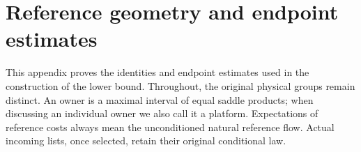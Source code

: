 \section{Reference geometry and endpoint estimates}
\label{app:endpoint-details}

This appendix proves the identities and endpoint estimates used in the
construction of the lower bound. Throughout, the original physical groups
remain distinct. An owner is a maximal interval of equal saddle products;
when discussing an individual owner we also call it a platform. Expectations
of reference costs always mean the unconditioned natural reference flow.
Actual incoming lists, once selected, retain their original conditional law.





